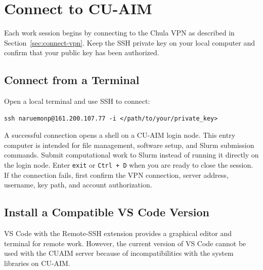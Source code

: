 \documentclass[11pt,oneside]{memoir}
\begin{document}
\chapter{Connect to CU-AIM}
\label{chap:access-server}

Each work session begins by connecting to the Chula VPN as described in Section~\ref{sec:connect-vpn}. Keep the SSH private key on your local computer and confirm that your public key has been authorized.

\section{Connect from a Terminal}
\label{sec:terminal-ssh}
Open a local terminal and use SSH to connect:
  \begin{lstlisting}[style=terminal]
ssh naruemonp@161.200.107.77 -i </path/to/your/private_key>
\end{lstlisting}
A successful connection opens a shell on a CU-AIM login node. This entry computer is intended for file management, software setup, and Slurm submission commands. Submit computational work to Slurm instead of running it directly on the login node. Enter \texttt{exit} or \texttt{Ctrl + D} when you are ready to close the session. If the connection fails, first confirm the VPN connection, server address, username, key path, and account authorization.

\section{Install a Compatible VS Code Version}
\label{sec:download-vscode}

VS Code with the Remote-SSH extension provides a graphical editor and terminal for remote work. However, the current version of VS Code cannot be used with the CUAIM server because of incompatibilities with the system libraries on CU-AIM.
\end{document}
